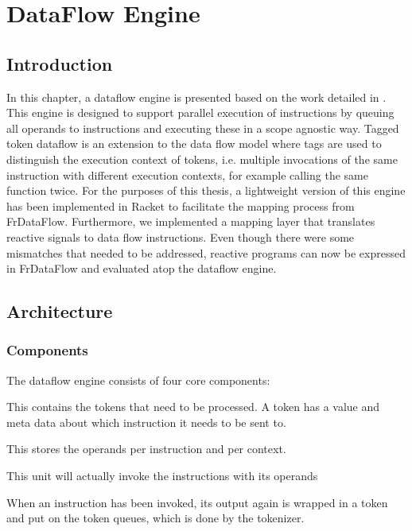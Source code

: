 \chapter{DataFlow Engine}

\section{Introduction}

In this chapter, a dataflow engine is presented based on the work detailed in \citet{saey_extensible_2017}.
This engine is designed to support parallel execution of instructions by queuing all operands to instructions and executing these in a scope agnostic way.
Tagged token dataflow is an extension to the data flow model where tags are used to distinguish the execution context of tokens, i.e. multiple invocations of the same instruction with different execution contexts, for example calling the same function twice.
For the purposes of this thesis, a lightweight version of this engine has been implemented in Racket to facilitate the mapping process from FrDataFlow. Furthermore, we implemented a mapping layer that translates reactive signals to data flow instructions. Even though there were some mismatches that needed to be addressed, reactive programs can now be expressed in FrDataFlow and evaluated atop the dataflow engine. 

\newpage
\section{Architecture}

\subsection{Components}

The dataflow engine consists of four core components:

\begin{description}[style=nextline]
	\item[The token queue] This contains the tokens that need to be processed. A token has a value and meta data about which instruction it needs to be sent to. 
	\item[The matching memory] This stores the operands per instruction and per context.
	\item[The execution unit] This unit will actually invoke the instructions with its operands
	\item[The tokenizer] When an instruction has been invoked, its output again is wrapped in a token and put on the token queues, which is done by the tokenizer.
\end{description}

